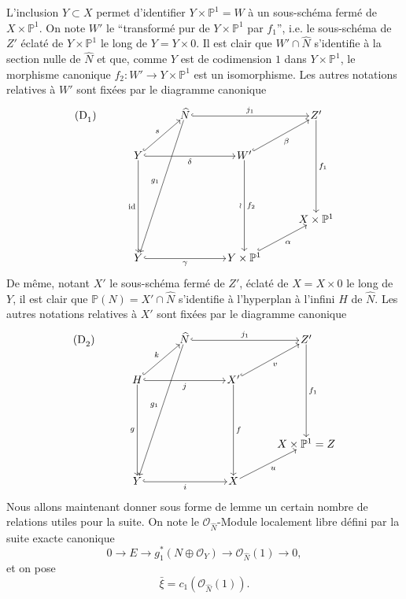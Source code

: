 L'inclusion $Y\subset X$ permet d'identifier $Y\times\mathbb{P}^1=W$ à un sous-schéma fermé de $X\times\mathbb{P}^1$. On note $W'$ le ``transformé pur de $Y\times\mathbb{P}^1$ par $f_1$'', i.e. le sous-schéma de $Z'$ éclaté de $Y\times\mathbb{P}^1$ le long de $Y=Y\times0$. Il est clair que $W'\cap\widehat N$ s'identifie à la section nulle de $\widehat N$ et que, comme $Y$ est de codimension $1$ dans $Y\times\mathbb{P}^1$, le morphisme canonique $f_2:W'\to Y\times\mathbb{P}^1$ est un isomorphisme. Les autres notations relatives à $W'$ sont fixées par le diagramme canonique
\[
\begin{tikzcd}[column sep=3.2em,row sep=2.4em,cells={nodes={inner sep=1pt}}]
\text{(D}_1\text{)}\arrow[from=1-3,to=5-2,"g_1"']
& & \widehat N \arrow[rr,hook,"j_1"] & & Z' \arrow[ddd,"f_1"] \\
& Y \arrow[ur,hook,"s"] \arrow[rr,hook,"\delta"'] \arrow[ddd,"\mathrm{id}"'] & &
W' \arrow[ur,hook,"\beta"'] \arrow[ddd,"\wr"',"f_2"] & \\
& & & & \\
& & & & X\times\mathbb{P}^1 \\
& Y \arrow[rr,hook,"\gamma"'] & & Y\times\mathbb{P}^1 \arrow[ur,hook,"\alpha"'] &
\end{tikzcd}
\]
De même, notant $X'$ le sous-schéma fermé de $Z'$, éclaté de $X=X\times0$ le long de $Y$, il est
clair que $\mathbb{P}(N)=X'\cap\widehat N$ s'identifie à l'hyperplan à l'infini $H$ de $\widehat N$. Les autres notations relatives à $X'$ sont fixées par le diagramme canonique
\[
\begin{tikzcd}[column sep=3.2em,row sep=2.4em,cells={nodes={inner sep=1pt}}]
\text{(D}_2\text{)}\arrow[from=1-3,to=5-2,"g_1"']
& & \widehat N \arrow[rr,hook,"j_1"] & & Z' \arrow[ddd,"f_1"] \\
& H \arrow[ur,hook,"k"] \arrow[rr,hook,"j"'] \arrow[ddd,"g"'] & &
X' \arrow[ur,hook,"v"'] \arrow[ddd,"f"] & \\
& & & & \\
& & & & X\times\mathbb{P}^1=Z \\
& Y \arrow[rr,hook,"i"'] & & X \arrow[ur,"u"'] &
\end{tikzcd}
\]
Nous allons maintenant donner sous forme de lemme un certain nombre de relations utiles pour la suite. On note le $\mathcal{O}_{\widehat N}$-Module localement libre défini par la suite exacte canonique
\[
0\to E\to g_1^*(N\oplus\mathcal{O}_Y)\to\mathcal{O}_{\widehat N}(1)\to0,
\tag{9.3.0}
\]
et on pose
\[
\bar\xi=c_1(\mathcal{O}_{\widehat N}(1)).
\tag{9.3.1}
\]

